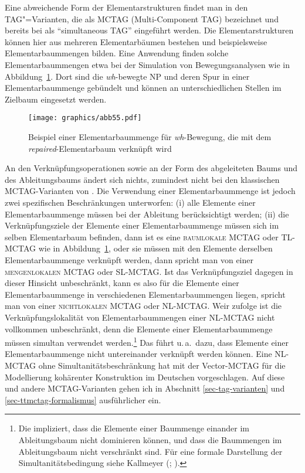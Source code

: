 Eine abweichende Form der Elementarstrukturen findet man in den TAG"=Varianten, die als \textsc{MCTAG} (Multi-Component TAG) bezeichnet und bereits bei \cite{Joshi:etal:75} als "`simultaneous TAG"' eingeführt werden. Die Elementarstrukturen können hier aus mehreren Elementarbäumen bestehen und beispielsweise Elementarbaummengen bilden. Eine Anwendung finden solche Elementarbaummengen  etwa bei der Simulation von Bewegungsanalysen wie in Abbildung~\ref{fig-mctag-bsp}. Dort sind die \textit{wh}-bewegte NP und deren Spur in einer Elementarbaummenge gebündelt und können an unterschiedlichen Stellen im Zielbaum eingesetzt werden.  
\begin{figure}[p]
\centering
\texttt{[image: graphics/abb55.pdf]}
\caption{\label{fig-mctag-bsp}Beispiel einer Elementarbaummenge für \textit{wh}-Bewegung, die mit dem {\it repaired}-Elementarbaum verknüpft wird}
\end{figure}
An den Verknüpfungsoperationen sowie an der Form des abgeleiteten Baums und des Ableitungsbaums ändert sich nichts, zumindest nicht bei den klassischen MCTAG-Varianten von \cite{Weir:88}. Die Verwendung einer Elementarbaummenge ist jedoch zwei spezifischen Beschränkungen unterworfen: (i) alle Elemente einer Elementarbaummenge müssen bei der Ableitung berücksichtigt werden; (ii) die Verknüpfungsziele der Elemente einer Elementarbaummenge müssen sich im selben  Elementarbaum befinden, dann ist es eine \textsc{baumlokale MCTAG} oder \textsc{TL-MCTAG} wie in Abbildung~\ref{fig-mctag-bsp}, oder sie müssen mit den Elemente derselben Elementarbaummenge verknüpft werden, dann spricht man von einer \textsc{mengenlokalen MCTAG} oder \textsc{SL-MCTAG}. Ist das Verknüpfungsziel dagegen in dieser Hinsicht unbeschränkt, kann es also für die Elemente einer Elementarbaummenge in verschiedenen Elementarbaummengen liegen, spricht man von einer \textsc{nichtlokalen MCTAG} oder \textsc{NL-MCTAG}. Weir zufolge ist die Verknüpfungslokalität von Elementarbaummengen einer NL-MCTAG nicht vollkommen unbeschränkt, denn die Elemente einer Elementar\-baummenge müssen simultan verwendet werden.\footnote{Die  impliziert, dass die Elemente einer Baummenge einander im Ableitungsbaum nicht dominieren können, und dass die Baummengen im Ableitungsbaum nicht verschränkt sind. Für eine formale Darstellung der Simultanitätsbedingung siehe Kallmeyer (\citeyear[197]{Kallmeyer:05}; \citeyear[65f]{Kallmeyer:09}).} Das führt u.\,a.\ dazu, dass Elemente einer Elementarbaummenge nicht untereinander verknüpft werden können. Eine NL-MCTAG ohne Simultanitätsbeschränkung hat \cite{Rambow:94} mit der Vector-MCTAG für die Modellierung kohärenter Konstruktion im Deutschen vorgeschlagen. Auf diese und andere MCTAG-Varianten gehen ich in Abschnitt \ref{sec-tag-varianten} und \ref{sec-ttmctag-formalismus} ausführlicher ein. 

